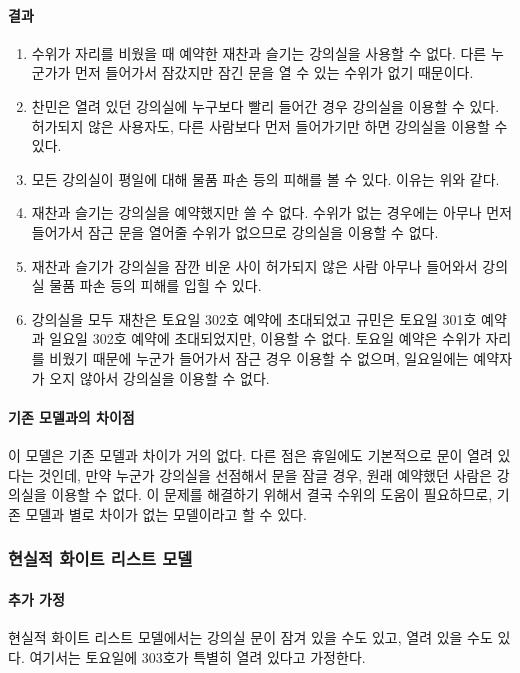 \documentclass[11pt,a4paper]{article}
\begin{document}
\paragraph{결과}
\begin{enumerate}
\item 수위가 자리를 비웠을 때 예약한 재찬과 슬기는 강의실을 사용할 수 없다.
다른 누군가가 먼저 들어가서 잠갔지만 잠긴 문을 열 수 있는 수위가 없기 때문이다.
\item 찬민은 열려 있던 강의실에 누구보다 빨리 들어간 경우 강의실을 이용할 수
있다. 허가되지 않은 사용자도, 다른 사람보다 먼저 들어가기만 하면 강의실을
이용할 수 있다.
\item 모든 강의실이 평일에 대해 물품 파손 등의 피해를 볼 수 있다. 이유는 위와
같다.
\item 재찬과 슬기는 강의실을 예약했지만 쓸 수 없다. 수위가 없는 경우에는 아무나
먼저 들어가서 잠근 문을 열어줄 수위가 없으므로 강의실을 이용할 수 없다.
\item 재찬과 슬기가 강의실을 잠깐 비운 사이 허가되지 않은 사람 아무나 들어와서
강의실 물품 파손 등의 피해를 입힐 수 있다.
\item 강의실을 모두 재찬은 토요일 302호 예약에 초대되었고 규민은 토요일 301호
예약과 일요일 302호 예약에 초대되었지만, 이용할 수 없다. 토요일 예약은 수위가
자리를 비웠기 때문에 누군가 들어가서 잠근 경우 이용할 수 없으며, 일요일에는
예약자가 오지 않아서 강의실을 이용할 수 없다.
\end{enumerate}

\paragraph{기존 모델과의 차이점}
\hfill\break
이 모델은 기존 모델과 차이가 거의 없다. 다른 점은 휴일에도 기본적으로 문이 열려
있다는 것인데, 만약 누군가 강의실을 선점해서 문을 잠글 경우, 원래 예약했던
사람은 강의실을 이용할 수 없다. 이 문제를 해결하기 위해서 결국 수위의 도움이
필요하므로, 기존 모델과 별로 차이가 없는 모델이라고 할 수 있다.

\subsubsection{현실적 화이트 리스트 모델}

\paragraph{추가 가정}
현실적 화이트 리스트 모델에서는 강의실 문이 잠겨 있을 수도 있고, 열려 있을 수도
있다. 여기서는 토요일에 303호가 특별히 열려 있다고 가정한다.
\end{document}
